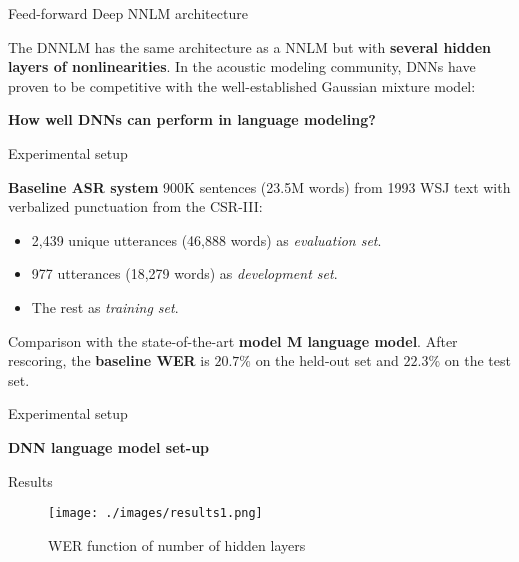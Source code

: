 \documentclass{beamer}
\begin{document}
\begin{frame}{Feed-forward Deep NNLM architecture}

The DNNLM has the same architecture as a NNLM but with \textbf{several hidden layers of nonlinearities}.
\newline
\newline
In the acoustic modeling community, DNNs have proven to be competitive with the well-established Gaussian mixture model:
\newline
\begin{center}
\textbf{How well DNNs can perform in language modeling?}
\end{center}

\end{frame}


\begin{frame}{Experimental setup}

\textbf{Baseline ASR system}
\newline
\newline
900K sentences (23.5M words) from 1993 WSJ text with verbalized punctuation from the CSR-III: \\
\begin{itemize}
    \item 2,439 unique utterances (46,888 words) as \textit{evaluation set}.
    \item 977 utterances (18,279 words) as \textit{development set}.
    \item The rest as \textit{training set}.\\
\end{itemize}

Comparison with the state-of-the-art \textbf{model M language model}.
\newline
\newline
After rescoring, the \textbf{baseline WER} is $20.7\%$ on the held-out set and $22.3\%$ on the test set.

\end{frame}

\begin{frame}{Experimental setup}

\textbf{DNN language model set-up}
\newline
\newline

\end{frame}

\begin{frame}{Results}
	\begin{figure}[!htb]
		\centering
	    \texttt{[image: ./images/results1.png]}
	    \caption{WER function of number of hidden layers}
	\end{figure}
\end{frame}
\end{document}

